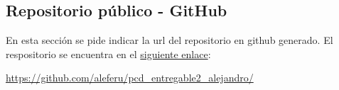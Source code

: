 \subsection{Repositorio público - GitHub}

En esta sección se pide indicar la url del repositorio en github generado. El respositorio se encuentra en el \href{https://github.com/aleferu/pcd_entregable2_alejandro/}{siguiente enlace}:

\begin{center}
    \url{https://github.com/aleferu/pcd_entregable2_alejandro/}
\end{center}
